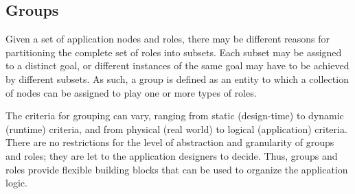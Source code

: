 

\subsection{Groups}




Given a set of application nodes and roles, there may be different reasons for partitioning the complete set of roles into subsets. Each subset may be assigned to a distinct goal, or different instances of the same goal may have to be achieved by different subsets. As such, a group is defined as an entity to which a collection of nodes can be assigned to play one or more types of roles. 

The criteria for grouping can vary, ranging from static (design-time) to dynamic (runtime) criteria, and from physical (real world) to logical (application) criteria. There are no restrictions for the level of abstraction and granularity of groups and roles; they are let to the application designers to decide. Thus, groups and roles provide flexible building blocks that can be used to organize the application logic.

